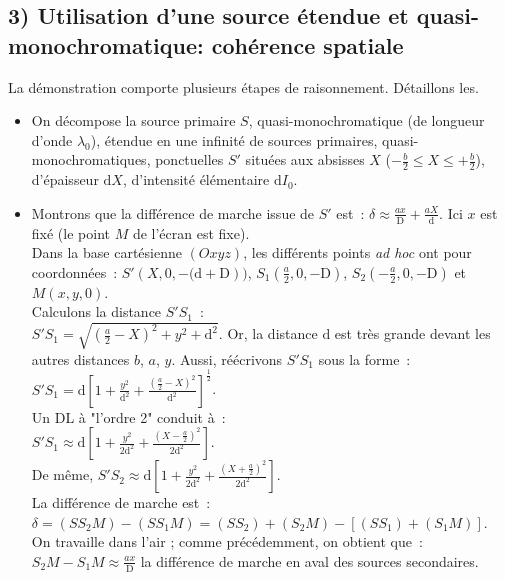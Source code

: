 \documentclass{article}
\begin{document}
\subsection*{3)  Utilisation d'une source étendue et quasi-monochromatique: cohérence
spatiale} La démonstration comporte plusieurs étapes de
raisonnement. Détaillons les.
\begin{itemize}
\item On décompose la source primaire $S$, quasi-monochromatique (de longueur d'onde $\lambda_{0}$), étendue
en une infinité de sources primaires, quasi-monochromatiques,
ponctuelles $S'$ situées aux absisses $X$ ($-\frac{b}{2}\leq X \leq
+\frac{b}{2}$), d'épaisseur $\mathrm{d}X$, d'intensité élémentaire $\mathrm{d}I_{0}$.
\item Montrons que la différence de marche issue de $S'$ est : $\delta \approx
\frac{ax}{\mathrm{D}}+\frac{aX}{\mathrm{d}}$. Ici $x$ est fixé (le point $M$ de
l'écran est fixe). \\
Dans la base cartésienne $(Oxyz)$, les différents points \textit{ad
hoc} ont pour coordonnées : $S'\left(X,0,-(\mathrm{d}+\mathrm{D}\right))$,
$S_{1}\left(\frac{a}{2},0,-\mathrm{D}\right)$, $S_{2}\left(-\frac{a}{2},0,-\mathrm{D}\right)$ et $M\left(x,y,0\right)$.
\\
Calculons la distance $S'S_{1}$ : \\
$S'S_{1}= \sqrt{\left(\frac{a}{2}-X\right)^{2}+y^{2}+\mathrm{d}^{2}}$. Or, la distance
$\mathrm{d}$ est très grande devant les autres distances $b$, $a$, $y$.
Aussi, réécrivons $S'S_{1}$ sous la forme : $S'S_{1} =
\mathrm{d}\left[1+\frac{y^{2}}{\mathrm{d}^{2}}+\frac{\left(\frac{a}{2}-X\right)^{2}}{\mathrm{d}^{2}}\right]^{\frac{1}{2}}$.
\\
Un DL à "l'ordre 2" conduit à : \\
$S'S_{1} \approx
\mathrm{d}\left[1+\frac{y^{2}}{2\mathrm{d}^{2}}+\frac{\left(X-\frac{a}{2}\right)^{2}}{2\mathrm{d}^{2}}\right]$.
\\
De même, $S'S_{2} \approx
\mathrm{d}\left[1+\frac{y^{2}}{2\mathrm{d}^{2}}+\frac{\left(X+\frac{a}{2}\right)^{2}}{2\mathrm{d}^{2}}\right]$. \\
La différence de marche est : $\delta = \left(SS_{2}M\right) - \left(SS_{1}M\right) = \left(SS_{2}\right) + \left(S_{2}M\right)-\left[\left(SS_{1}\right)+\left(S_{1}M\right)\right]$.  \\
On travaille dans l'air ; comme précédemment, on obtient que :
$S_{2}M-S_{1}M \approx \frac{ax}{\mathrm{D}}$ la différence de marche en
aval des sources secondaires. \\

\end{itemize}
\end{document}
